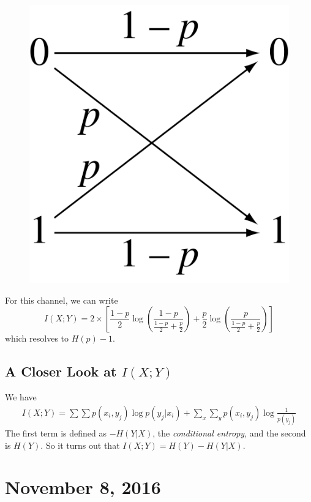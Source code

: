 \documentclass[11pt]{article}
\theoremstyle{definition}
\begin{document}
\begin{figure}[ht]
\centering
\includegraphics[scale=0.1]{binarysymmetric}
\end{figure}

For this channel, we can write
$$ 
I(X; Y) = 2 \times \left[ \frac{1-p}{2} \log \left( \frac{1-p}{\frac{1-p}{2} + \frac{p}{2}} \right) + 
	      \frac{p}{2} \log \left( \frac{p}{\frac{1-p}{2} + \frac{p}{2}} \right) \right]
$$
which resolves to $H(p) - 1$.

\subsection{A Closer Look at $I(X;Y)$}

We have 
\begin{align*}
I(X;Y) = \sum \sum p(x_i, y_j) \log p(y_j | x_i) + \sum_x \sum_y p(x_i, y_j) \log \frac{1}{p(y_j)}
\end{align*}
The first term is defined as $-H(Y|X)$, the \textit{conditional entropy}, and the second is $H(Y)$. So it turns out that $I(X;Y) = H(Y) - H(Y|X)$.

\section{November 8, 2016}
\end{document}
